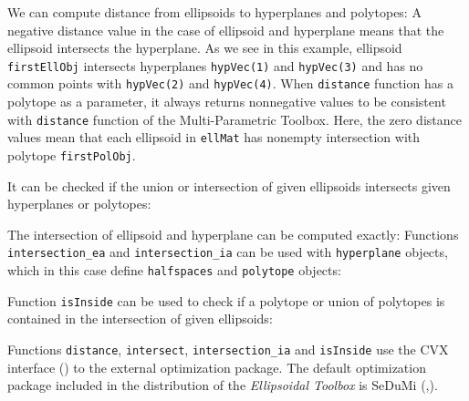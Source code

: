 We can compute distance from ellipsoids to hyperplanes and polytopes:
A negative distance value in the case of ellipsoid and hyperplane means that
the ellipsoid intersects the hyperplane. As we see in this example, ellipsoid
{\tt firstEllObj} intersects  hyperplanes {\tt hypVec(1)} and {\tt hypVec(3)} and has
no common points with {\tt hypVec(2)} and {\tt hypVec(4)}. When {\tt distance} function
has a polytope as a parameter, it always returns nonnegative values to be
consistent with {\tt distance} function of the Multi-Parametric Toolbox.
Here, the zero distance values mean that each ellipsoid in {\tt ellMat} has
nonempty intersection with polytope {\tt firstPolObj}.

It can be checked if the union or intersection of given ellipsoids intersects
given hyperplanes or polytopes:



The intersection of ellipsoid and hyperplane can be computed exactly:
Functions {\tt intersection\_ea} and {\tt intersection\_ia} can be used
with {\tt hyperplane} objects, which in this case define {\tt halfspaces} and
{\tt polytope} objects:

Function {\tt isInside} can be used to check if a polytope or union of
polytopes is contained in the intersection of given ellipsoids:

Functions {\tt distance}, {\tt intersect}, {\tt intersection\_ia} and
{\tt isInside} use the CVX interface (\cite{CVX_HOMEPAGE}) to the
external optimization package. The default optimization package included
in the distribution of the {\it Ellipsoidal Toolbox} is SeDuMi
(\cite{STURM_USING_SEDUMI},\cite{SEDUMI_HOMEPAGE}).

